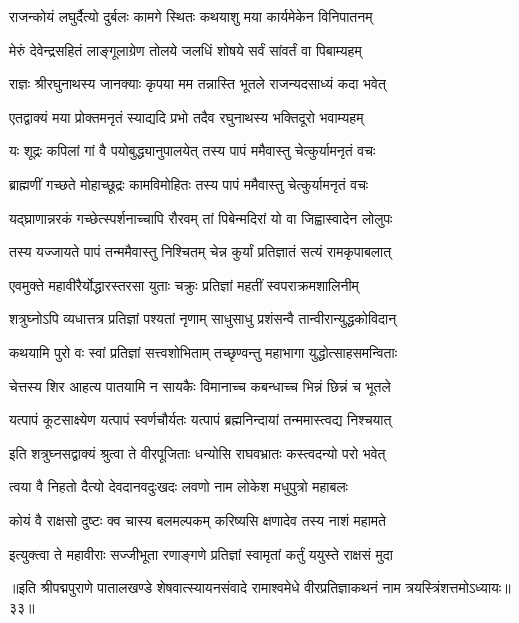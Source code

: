 \twolineshloka
{राजन्कोयं लघुर्दैत्यो दुर्बलः कामगे स्थितः}
{कथयाशु मया कार्यमेकेन विनिपातनम्}%

\twolineshloka
{मेरुं देवेन्द्रसहितं लाङ्गूलाग्रेण तोलये}
{जलधिं शोषये सर्वं सांवर्तं वा पिबाम्यहम्}%

\twolineshloka
{राज्ञः श्रीरघुनाथस्य जानक्याः कृपया मम}
{तन्नास्ति भूतले राजन्यदसाध्यं कदा भवेत्}%

\twolineshloka
{एतद्वाक्यं मया प्रोक्तमनृतं स्याद्यदि प्रभो}
{तदैव रघुनाथस्य भक्तिदूरो भवाम्यहम्}%

\twolineshloka
{यः शूद्रः कपिलां गां वै पयोबुद्ध्यानुपालयेत्}
{तस्य पापं ममैवास्तु चेत्कुर्यामनृतं वचः}%

\twolineshloka
{ब्राह्मणीं गच्छते मोहाच्छूद्रः कामविमोहितः}
{तस्य पापं ममैवास्तु चेत्कुर्यामनृतं वचः}%

\twolineshloka
{यद्घ्राणान्नरकं गच्छेत्स्पर्शनाच्चापि रौरवम्}
{तां पिबेन्मदिरां यो वा जिह्वास्वादेन लोलुपः}%

\twolineshloka
{तस्य यज्जायते पापं तन्ममैवास्तु निश्चितम्}
{चेन्न कुर्यां प्रतिज्ञातं सत्यं रामकृपाबलात्}%

\twolineshloka
{एवमुक्ते महावीरैर्योद्धारस्तरसा युताः}
{चक्रुः प्रतिज्ञां महतीं स्वपराक्रमशालिनीम्}%

\twolineshloka
{शत्रुघ्नोऽपि व्यधात्तत्र प्रतिज्ञां पश्यतां नृणाम्}
{साधुसाधु प्रशंसन्वै तान्वीरान्युद्धकोविदान्}%

\twolineshloka
{कथयामि पुरो वः स्वां प्रतिज्ञां सत्त्वशोभिताम्}
{तच्छृण्वन्तु महाभागा युद्धोत्साहसमन्विताः}%

\twolineshloka
{चेत्तस्य शिर आहत्य पातयामि न सायकैः}
{विमानाच्च कबन्धाच्च भिन्नं छिन्नं च भूतले}%

\twolineshloka
{यत्पापं कूटसाक्ष्येण यत्पापं स्वर्णचौर्यतः}
{यत्पापं ब्रह्मनिन्दायां तन्ममास्त्वद्य निश्चयात्}%

\twolineshloka
{इति शत्रुघ्नसद्वाक्यं श्रुत्वा ते वीरपूजिताः}
{धन्योसि राघवभ्रातः कस्त्वदन्यो परो भवेत्}%

\twolineshloka
{त्वया वै निहतो दैत्यो देवदानवदुःखदः}
{लवणो नाम लोकेश मधुपुत्रो महाबलः}%

\twolineshloka
{कोयं वै राक्षसो दुष्टः क्व चास्य बलमल्पकम्}
{करिष्यसि क्षणादेव तस्य नाशं महामते}%

\twolineshloka
{इत्युक्त्वा ते महावीराः सज्जीभूता रणाङ्गणे}
{प्रतिज्ञां स्वामृतां कर्तुं ययुस्ते राक्षसं मुदा}%

{॥इति श्रीपद्मपुराणे पातालखण्डे शेषवात्स्यायनसंवादे रामाश्वमेधे वीरप्रतिज्ञाकथनं नाम त्रयस्त्रिंशत्तमोऽध्यायः॥३३॥}

